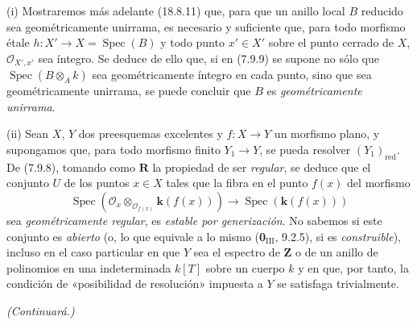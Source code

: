 \begin{remarks}[7.9.10]
\label{IV.2.s7.9.10-fr}
(i) Mostraremos más adelante (18.8.11) que, para que un anillo local $B$ reducido
sea geométricamente unirrama, es necesario y suficiente que, para todo morfismo
étale $h:X'\to X=\operatorname{Spec}(B)$ y todo punto $x'\in X'$ sobre
el punto cerrado de $X$, $\mathcal O_{X',x'}$ sea íntegro. Se deduce de ello que, si
en (7.9.9) se supone no sólo que
$\operatorname{Spec}(B\otimes_Ak)$ sea geométricamente íntegro
en cada punto, sino que sea geométricamente unirrama, se puede concluir que $B$ es
\emph{geométricamente unirrama}.


(ii) Sean $X$, $Y$ dos preesquemas excelentes y $f:X\to Y$ un morfismo
plano, y supongamos que, para todo morfismo finito $Y_1\to Y$, se pueda resolver
$(Y_1)_{\mathrm{red}}$. De (7.9.8), tomando como
$\boldsymbol R$ la propiedad de ser \emph{regular}, se deduce que el conjunto $U$ de los puntos
$x\in X$ tales que la fibra en el punto $f(x)$ del morfismo
\[
\operatorname{Spec}(\mathcal O_x\otimes_{\mathcal O_{f(x)}}\boldsymbol{k}(f(x)))
\longrightarrow\operatorname{Spec}(\boldsymbol{k}(f(x)))
\]
sea \emph{geométricamente regular}, es \emph{estable por generización}. No sabemos si
este conjunto es \emph{abierto} (o, lo que equivale a lo mismo (\textbf 0$_{\mathrm{III}}$,
9.2.5), si es \emph{construible}), incluso en el caso particular en que $Y$ sea el
espectro de $\mathbf Z$ o de un anillo de polinomios en una indeterminada $k[T]$
sobre un cuerpo $k$ y en que, por tanto, la condición de «posibilidad de resolución» impuesta a
$Y$ se satisfaga trivialmente.
\end{remarks}

\begin{center}
\emph{(Continuará.)}
\end{center}

